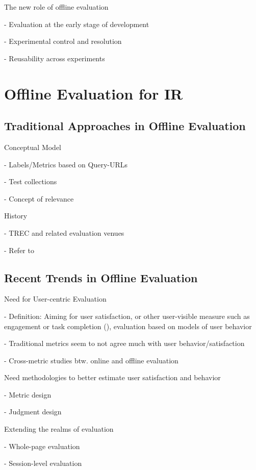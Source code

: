 \documentclass[openany]{now} %
\newcommand{\newpar}{\bigskip\noindent}
\begin{document}
\newpar
The new role of offline evaluation

- Evaluation at the early stage of development

- Experimental control and resolution

- Reusability across experiments

\section{Offline Evaluation for IR}
\subsection{Traditional Approaches in Offline Evaluation}

Conceptual Model

- Labels/Metrics based on Query-URLs

- Test collections 

- Concept of relevance 

\newpar
History

- TREC and related evaluation venues \cite{INR-009}

- Refer to \cite{borlund2003} \cite{cleverdon67} \cite{voor:trec05}

\subsection{Recent Trends in Offline Evaluation}

Need for User-centric Evaluation

- Definition: Aiming for user satisfaction, or other user-visible measure such as engagement or task completion (\cite{scholer13}), evaluation based on models of user behavior

- Traditional metrics seem to not agree much with user behavior/satisfaction
 \cite{Al-Maskari2007} 

- Cross-metric studies btw. online and offline evaluation \cite{radl:comp10}

\newpar
Need methodologies to better estimate user satisfaction and behavior

-	Metric design \cite{YilmazSCR10, CarteretteKY11, ChapelleMZG09}

-	Judgment design \cite{VermaY16, VermaYC16}

\newpar
Extending the realms of evaluation

-	Whole-page evaluation \cite{Zhou:2012}

-	Session-level evaluation \cite{KanoulasCCS11, CarteretteKHC14}
\end{document}
